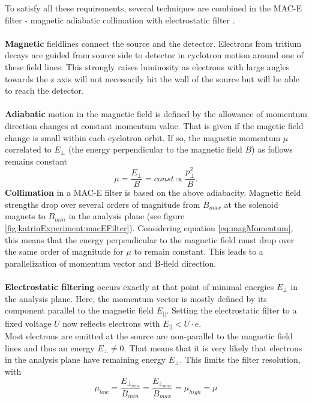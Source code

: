 		To satisfy all these requirements, several techniques are combined in the MAC-E filter - magnetic adiabatic collimation with electrostatic filter \cite{katrinPrinciple}.\\\\
		{\bf Magnetic} fieldlines connect the source and the detector. Electrons from tritium decays are guided from source side to detector in cyclotron motion around one of these field lines. This strongly raises luminosity as electrons with large angles towards the z axis will not necessarily hit the wall of the source but will be able to reach the detector.\\\\
		{\bf Adiabatic} motion in the magnetic field is defined by the allowance of momentum direction changes at constant momentum value. That is given if the magetic field change is small within each cyclotron orbit. If so, the magnetic momentum $\mu$ correlated to $E_\bot$ (the energy perpendicular to the magnetic field $B$) as follows remains constant
		\begin{equation}
			\mu = \frac{E_{\bot}}{B} = const \propto \frac{p^2_\bot}{B}.
			\label{eq:magMomentum}
		\end{equation}
		{\bf Collimation} in a MAC-E filter is based on the above adiabacity. Magnetic field strengths drop over several orders of magnitude from $B_{max}$ at the solenoid magnets to $B_{min}$ in the analysis plane (see figure \ref{fig:katrinExperiment:macEFilter}). Considering equation \ref{eq:magMomentum}, this means that the energy perpendicular to the magnetic field must drop over the same order of magnitude for $\mu$ to remain constant. This leads to a parallelization of momentum vector and B-field direction. \\\\
		{\bf Electrostatic filtering} occurs exactly at that point of minimal energies $E_\bot$ in the analysis plane. Here, the momentum vector is mostly defined by its component parallel to the magnetic field $E_{||}$. Setting the electrostatic filter to a fixed voltage $U$ now reflects electrons with $E_{||} < U\cdot e$.\\
		Most electrons are emitted at the source are non-parallel to the magnetic field lines and thus an energy $E_\bot \neq 0$. That means that it is very likely that electrons in the analysis plane have remaining energy $E_\bot$. This limits the filter resolution, with 
		\begin{equation}
			\mu_{low} = \frac{E_{\bot_{min}}}{B_{min}} = \frac{E_{\bot_{max}}}{B_{max}} = \mu_{high} = \mu
		\end{equation}

